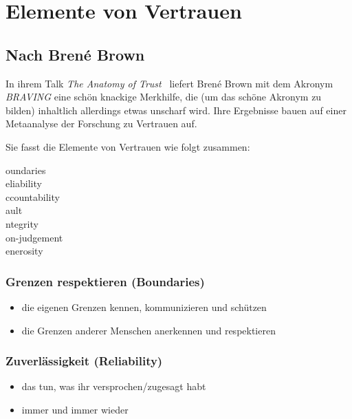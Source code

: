 \section{Elemente von Vertrauen}
\label{vertrauen-elemente}


\subsection{Nach Brené Brown}

In ihrem Talk \emph{The Anatomy of Trust}~\cite{anatomy-of-trust} liefert Brené Brown mit dem Akronym \emph{BRAVING} eine schön knackige Merkhilfe, die (um das schöne Akronym zu bilden) inhaltlich allerdings etwas unscharf wird. Ihre Ergebnisse bauen auf einer Metaanalyse der Forschung zu Vertrauen auf.

Sie fasst die Elemente von Vertrauen wie folgt zusammen:

oundaries \\
eliability \\
ccountability \\
ault \\
ntegrity \\
on-judgement \\
enerosity


\subsubsection{Grenzen respektieren (Boundaries)}

\begin{itemize}
  \item die eigenen Grenzen kennen, kommunizieren und schützen
  \item die Grenzen anderer Menschen anerkennen und respektieren
\end{itemize}



\subsubsection{Zuverlässigkeit (Reliability)}

\begin{itemize}
  \item das tun, was ihr versprochen/zugesagt habt
  \item immer und immer wieder
\end{itemize}


